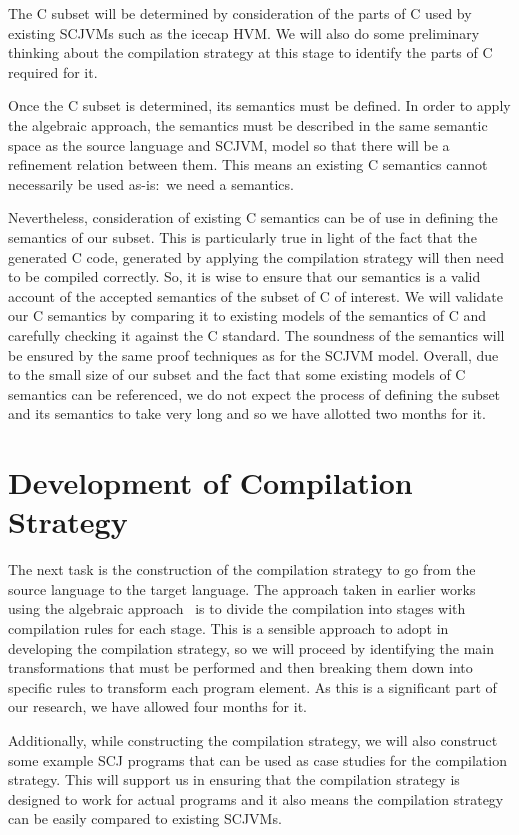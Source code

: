 \documentclass[a4paper,10pt]{report}
\begin{document}
The C subset will be determined by consideration of the parts of C
used by existing SCJVMs such as the icecap HVM.
We will also do some preliminary thinking about the compilation
strategy at this stage to identify the parts of C required for it.

Once the C subset is determined, its semantics must be defined.
In order to apply the algebraic approach, the semantics must be
described in the same semantic space as the source language and SCJVM,
model so that there will be a refinement relation between them.
This means an existing C semantics cannot necessarily be used
as-is:~we need a \Circus{} semantics.

Nevertheless, consideration of existing C semantics can be of use in
defining the semantics of our subset.
This is particularly true in light of the fact that the generated C
code, generated by applying the compilation strategy will then need to
be compiled correctly.
So, it is wise to ensure that our semantics is a valid account of the
accepted semantics of the subset of C of interest.
We will validate our C semantics by comparing it to existing models of
the semantics of C and carefully checking it against the C standard.
The soundness of the semantics will be ensured by the same proof
techniques as for the SCJVM model.
Overall, due to the small size of our subset and the fact that some
existing models of C semantics can be referenced, we do not expect the
process of defining the subset and its semantics to take very long and
so we have allotted two months for it.

\section{Development of Compilation Strategy}

The next task is the construction of the compilation strategy to go
from the source language to the target language.
The approach taken in earlier works using the algebraic
approach~\cite{sampaio1993,duran2005} is to divide the compilation
into stages with compilation rules for each stage.
This is a sensible approach to adopt in developing the compilation
strategy, so we will proceed by identifying the main transformations
that must be performed and then breaking them down into specific rules
to transform each program element.
As this is a significant part of our research, we have allowed four
months for it.

Additionally, while constructing the compilation strategy, we will
also construct some example SCJ programs that can be used as case
studies for the compilation strategy.
This will support us in ensuring that the compilation strategy is
designed to work for actual programs and it also means the
compilation strategy can be easily compared to existing SCJVMs.
\end{document}
